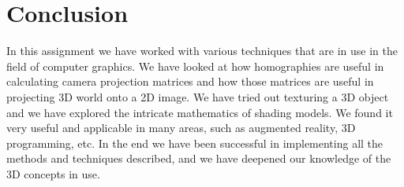 \section{Conclusion}
In this assignment we have worked with various techniques that are in use in the field of computer graphics. We have looked at how homographies are useful in calculating camera projection matrices and how those matrices are useful in projecting 3D world onto a 2D image. We have tried out texturing a 3D object and we have explored the intricate mathematics of shading models. We found it very useful and applicable in many areas, such as augmented reality, 3D programming, etc. In the end we have been successful in implementing all the methods and techniques described, and we have deepened our knowledge of the 3D concepts in use.
